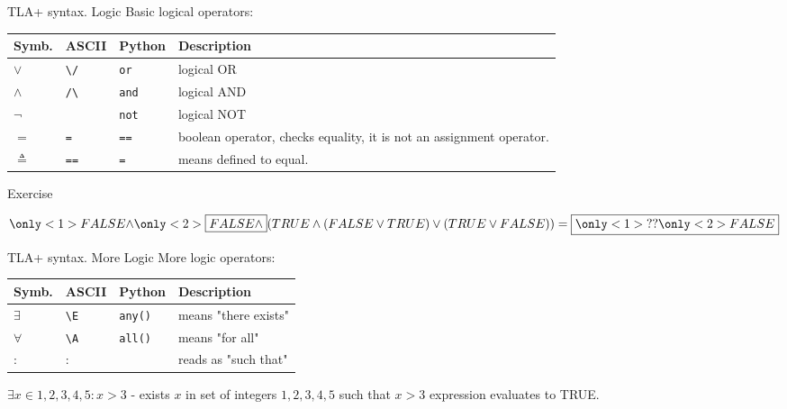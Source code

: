 \documentclass[12pt]{beamer}
\begin{document}
  \begin{frame}{TLA+ syntax. Logic}
      Basic logical operators:
        \begin{table}
        \centering
            \begin{tabular}{@{} lllp{7cm} @{}}
                Symb.         & ASCII                       & Python & Description   \\ \hline
                $\lor$        & \texttt{\textbackslash /}   & \texttt{or} &logical OR \\
                $\land$       & \texttt{/\textbackslash}   & \texttt{and} &logical AND \\
                $\lnot$       & \texttt{~}                  & \texttt{not} &logical NOT \\
                $=$           & \texttt{=}                  & \texttt{==} & boolean operator, checks equality, it is not an assignment operator. \\
                $\triangleq$  & \texttt{==}                 & \texttt{=} & means defined to equal.

            \end{tabular}
        \end{table}
  \end{frame}
  \begin{frame}{Exercise}
    \begin{center}
        $ \only<1>{FALSE \land}\only<2>{\boxed{FALSE \land}} (TRUE \land (FALSE \lor TRUE) \lor (TRUE \lor FALSE)) =  \boxed{\only<1>{??}\only<2>{FALSE}}$
    \end{center}
  \end{frame}
  \begin{frame}{TLA+ syntax. More Logic}
      More logic operators:
        \begin{table}
        \centering
            \begin{tabular}{@{} lllp{7cm} @{}}
                Symb.     & ASCII                     & Python                     & Description   \\ \hline
                $\exists$ & \texttt{\textbackslash E} & \texttt{any()} & means "there exists"\\
                $\forall$ & \texttt{\textbackslash A} & \texttt{all()} & means "for all"\\
                $:$       & $:$                       &                            & reads as "such that"
            \end{tabular}
        \end{table}

      $\exists x \in {1,2,3,4,5} : x > 3$ - exists $x$ in
      set of integers ${1,2,3,4,5}$ such that $x > 3$ expression evaluates
      to TRUE.
  \end{frame}
\end{document}
